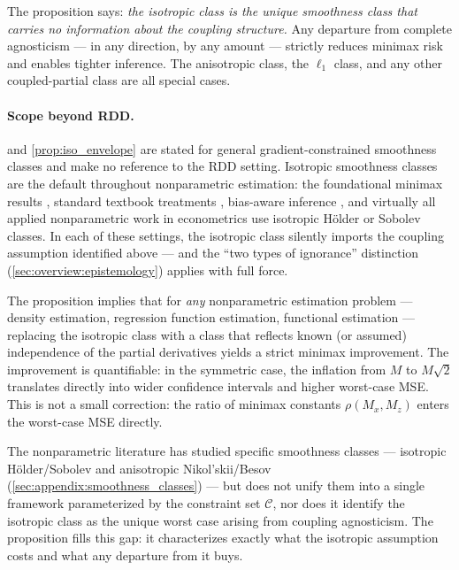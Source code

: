 The proposition says: \emph{the isotropic class is the unique smoothness class that carries no information about the coupling structure.}
Any departure from complete agnosticism --- in any direction, by any amount --- strictly reduces minimax risk and enables tighter inference.
The anisotropic class, the $\ell_1$ class, and any other coupled-partial class are all special cases.

\paragraph{Scope beyond RDD.}
 and \cref{prop:iso_envelope} are stated for general gradient-constrained smoothness classes and make no reference to the RDD setting.
Isotropic smoothness classes are the default throughout nonparametric estimation: the foundational minimax results \parencite{stone_optimal_1980}, standard textbook treatments \parencite{tsybakov_introduction_2009}, bias-aware inference \parencite{armstrong_simple_2020}, and virtually all applied nonparametric work in econometrics use isotropic Hölder or Sobolev classes.
In each of these settings, the isotropic class silently imports the coupling assumption identified above --- and the ``two types of ignorance'' distinction (\cref{sec:overview:epistemology}) applies with full force.

The proposition implies that for \emph{any} nonparametric estimation problem --- density estimation, regression function estimation, functional estimation --- replacing the isotropic class with a class that reflects known (or assumed) independence of the partial derivatives yields a strict minimax improvement.
The improvement is quantifiable: in the symmetric case, the inflation from $M$ to $M\sqrt{2}$ translates directly into wider confidence intervals and higher worst-case MSE.
This is not a small correction: the ratio of minimax constants $\rho(M_x, M_z)$ enters the worst-case MSE directly.

The nonparametric literature has studied specific smoothness classes --- isotropic Hölder/Sobolev and anisotropic Nikol'skii/Besov (\cref{sec:appendix:smoothness_classes}) --- but does not unify them into a single framework parameterized by the constraint set $\mathcal{C}$, nor does it identify the isotropic class as the unique worst case arising from coupling agnosticism.
The proposition fills this gap: it characterizes exactly what the isotropic assumption costs and what any departure from it buys.

